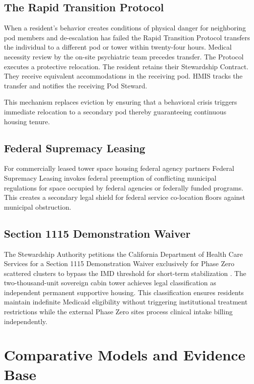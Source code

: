 \documentclass[12pt, letterpaper]{article}
\begin{document}
\subsection{The Rapid Transition Protocol}

When a resident's behavior creates conditions of physical danger for neighboring pod members and de-escalation has failed the Rapid Transition Protocol transfers the individual to a different pod or tower within twenty-four hours. Medical necessity review by the on-site psychiatric team precedes transfer. The Protocol executes a protective relocation. The resident retains their Stewardship Contract. They receive equivalent accommodations in the receiving pod. HMIS tracks the transfer and notifies the receiving Pod Steward.

This mechanism replaces eviction by ensuring that a behavioral crisis triggers immediate relocation to a secondary pod thereby guaranteeing continuous housing tenure.

\subsection{Federal Supremacy Leasing}

For commercially leased tower space housing federal agency partners Federal Supremacy Leasing invokes federal preemption of conflicting municipal regulations for space occupied by federal agencies or federally funded programs. This creates a secondary legal shield for federal service co-location floors against municipal obstruction.

\subsection{Section 1115 Demonstration Waiver}

The Stewardship Authority petitions the California Department of Health Care Services for a Section 1115 Demonstration Waiver exclusively for Phase Zero scattered clusters to bypass the IMD threshold for short-term stabilization \citep{calaim_1115_waiver_2023}. The two-thousand-unit sovereign cabin tower achieves legal classification as independent permanent supportive housing. This classification ensures residents maintain indefinite Medicaid eligibility without triggering institutional treatment restrictions while the external Phase Zero sites process clinical intake billing independently.

\clearpage
\section{Comparative Models and Evidence Base}
\end{document}
